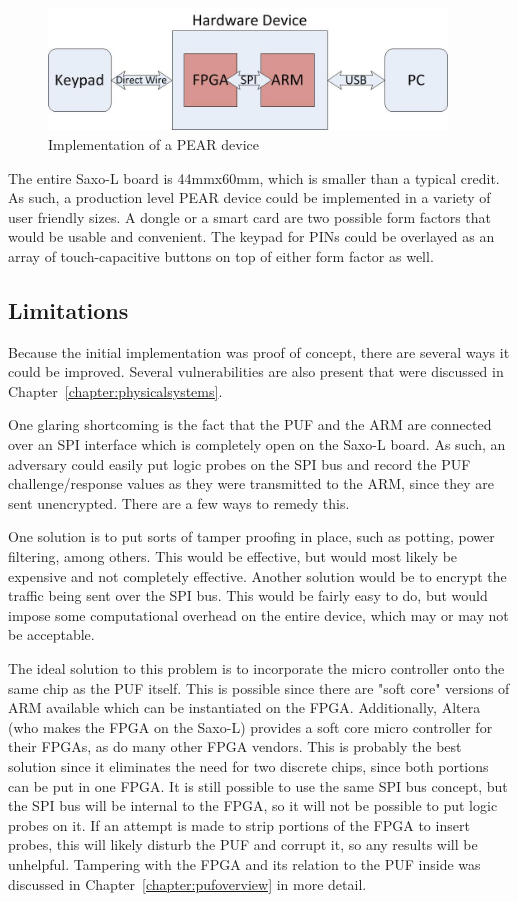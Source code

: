 \begin{figure}[!ht]
\centering
\includegraphics[width=400px]{images/pearimpl.jpg}
\caption{Implementation of a PEAR device}
\label{fig:peararchitecture}
\end{figure}
\FloatBarrier

The entire Saxo-L board is 44mmx60mm, which is smaller than a typical credit. As such, a production level PEAR
device could be implemented in a variety of user friendly sizes. A dongle or a smart card are two possible form
factors that would be usable and convenient. The keypad for PINs could be overlayed as an array of touch-capacitive 
buttons on top of either form factor as well.

\subsection{Limitations}
Because the initial implementation was proof of concept, there are several ways it could be improved. Several
vulnerabilities are also present that were discussed in Chapter~\ref{chapter:physicalsystems}.

One glaring shortcoming is the fact that the PUF and the ARM are connected over an SPI interface which is completely
open on the Saxo-L board. As such, an adversary could easily put logic probes on the SPI bus and record the PUF
challenge/response values as they were transmitted to the ARM, since they are sent unencrypted. There are a few
ways to remedy this. 

One solution is to put sorts of tamper proofing in place, such as potting, power filtering, among others. 
This would be effective, but would most likely be expensive and not completely effective. Another solution would
be to encrypt the traffic being sent over the SPI bus. This would be fairly easy to do, but would impose some
computational overhead on the entire device, which may or may not be acceptable. 

The ideal solution to this problem is to incorporate the micro controller onto the same chip as the PUF itself. This
is possible since there are "soft core" versions of ARM available which can be instantiated on the FPGA. Additionally,
Altera (who makes the FPGA on the Saxo-L) provides a soft core micro controller for their FPGAs, as do many other
FPGA vendors. This is probably the best solution since it eliminates the need for two discrete chips, since both portions
can be put in one FPGA. It is still possible to use the same SPI bus concept, but the SPI bus will be internal to the
FPGA, so it will not be possible to put logic probes on it. If an attempt is made to strip portions of the FPGA to
insert probes, this will likely disturb the PUF and corrupt it, so any results will be unhelpful. Tampering with the FPGA
and its relation to the PUF inside was discussed in Chapter~\ref{chapter:pufoverview} in more detail.

